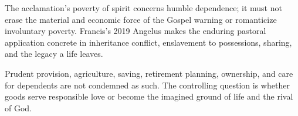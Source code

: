 The acclamation's poverty of spirit concerns humble dependence; it must not
erase the material and economic force of the Gospel warning or romanticize
involuntary poverty. Francis's 2019 Angelus makes the enduring pastoral
application concrete in inheritance conflict, enslavement to possessions,
sharing, and the legacy a life leaves.

Prudent provision, agriculture, saving, retirement planning, ownership, and
care for dependents are not condemned as such. The controlling question is
whether goods serve responsible love or become the imagined ground of life
and the rival of God.
\label{triptych:brief-synthesis:end}
